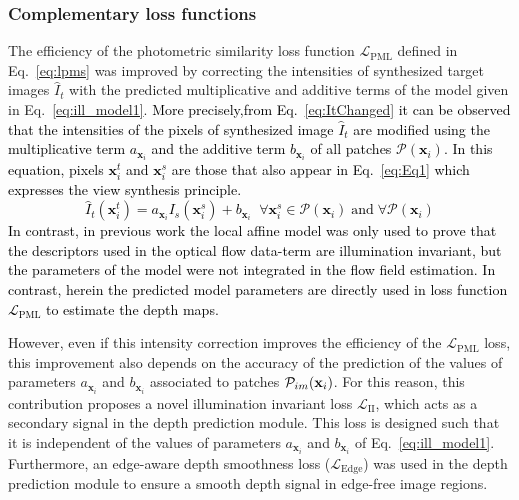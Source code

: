 \documentclass[a4paper,fleqn]{cas-dc}
\begin{document}
\subsubsection{Complementary loss functions \label{sec:clf}}
%
%
The efficiency of the photometric similarity loss function $\mathcal{L}_{\textrm{PML}}$ defined in Eq.~\eqref{eq:lpms} was improved by correcting the intensities of synthesized target images $\hat{I}_t$ with the predicted multiplicative and additive terms of the model given in Eq.~\eqref{eq:ill_model1}. \textcolor{black}{More precisely,from Eq.~\eqref{eq:ItChanged} it can be observed that the intensities of the pixels of synthesized image $\hat{I}_t$ are modified using the multiplicative term $a_{\mathbf{x}_i}$ and the additive term $b_{\mathbf{x}_i}$ of all patches $\mathcal{P}({\mathbf{x}_i})$. In this equation, pixels $\mathbf{x}^t_i$ and $\mathbf{x}^s_i$ are those that also appear in Eq.~\eqref{eq:Eq1} which expresses the view synthesis principle.}
%
\textcolor{black}{
\begin{equation} \label{eq:ItChanged}
\hat{I}_t\left(\mathbf{x}^t_i\right) = 
  a_{\mathbf{x}_i}I_s\left(\mathbf{x}^s_i\right) + b_{\mathbf{x}_i} \;\; \forall{\mathbf{x}^s_i \in \mathcal{P}({\mathbf{x}_i}) \; \textrm{and} \; \forall{\mathcal{P}({\mathbf{x}_i})}} 
\end{equation}
}
\textcolor{black}{In contrast, in previous work \citep{Trinh_CVIU_2019} the local affine model was only used to prove that the descriptors used in the optical flow data-term are illumination invariant, but the parameters of the model were not integrated in the flow field estimation. In contrast, herein the predicted model parameters are directly used in loss function $\mathcal{L}_{\textrm{PML}}$ to estimate the depth maps.}
%

However, even if this intensity correction improves the efficiency of the $\mathcal{L}_{\textrm{PML}}$ loss, this improvement also depends on the accuracy of the prediction of the values of parameters $a_{\mathbf{x}_i}$ and $b_{\mathbf{x}_i}$ associated to patches $\mathcal{P}_{im}({\bf x}_i)$. For this reason, this contribution proposes a novel illumination invariant loss $\mathcal{L}_{\textrm{II}}$, which acts as a secondary signal in the depth prediction module. This loss is designed such that it is independent of the values of parameters $a_{\mathbf{x}_i}$ and $b_{\mathbf{x}_i}$ of Eq.~\eqref{eq:ill_model1}.
Furthermore, an edge-aware depth smoothness loss ($\mathcal{L}_{\textrm{Edge}}$)  was used in the depth prediction module to ensure a smooth depth signal in edge-free image regions.
%
\end{document}
